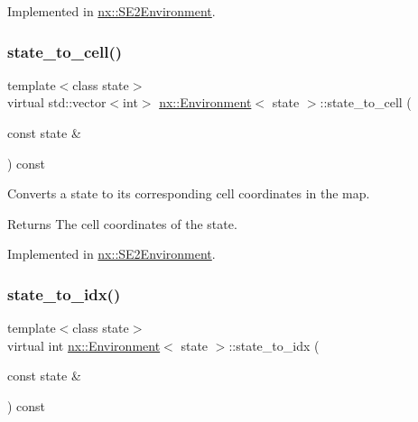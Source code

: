 Implemented in \hyperlink{classnx_1_1SE2Environment_a2a4159dc6bf024e522bb504c77e9aa69}{nx\+::\+S\+E2\+Environment}.

\mbox{\label{classnx_1_1Environment_adb86237d799683c40f17c95ea39eeba3}} 
\subsubsection{\texorpdfstring{state\+\_\+to\+\_\+cell()}{state\_to\_cell()}}
{\footnotesize\ttfamily template$<$class state$>$ \\
virtual std\+::vector$<$int$>$ \hyperlink{classnx_1_1Environment}{nx\+::\+Environment}$<$ state $>$\+::state\+\_\+to\+\_\+cell (\begin{DoxyParamCaption}\item[{const state \&}]{ }\end{DoxyParamCaption}) const\hspace{0.3cm}{\ttfamily [pure virtual]}}

Converts a state to its corresponding cell coordinates in the map. \begin{DoxyReturn}{Returns}
The cell coordinates of the state. 
\end{DoxyReturn}


Implemented in \hyperlink{classnx_1_1SE2Environment_ae3ac780e46d421898e3c7db696d8026f}{nx\+::\+S\+E2\+Environment}.

\mbox{\label{classnx_1_1Environment_a1c558036435de03a3afd85e940aad600}} 
\subsubsection{\texorpdfstring{state\+\_\+to\+\_\+idx()}{state\_to\_idx()}}
{\footnotesize\ttfamily template$<$class state$>$ \\
virtual int \hyperlink{classnx_1_1Environment}{nx\+::\+Environment}$<$ state $>$\+::state\+\_\+to\+\_\+idx (\begin{DoxyParamCaption}\item[{const state \&}]{ }\end{DoxyParamCaption}) const\hspace{0.3cm}{\ttfamily [pure virtual]}}

